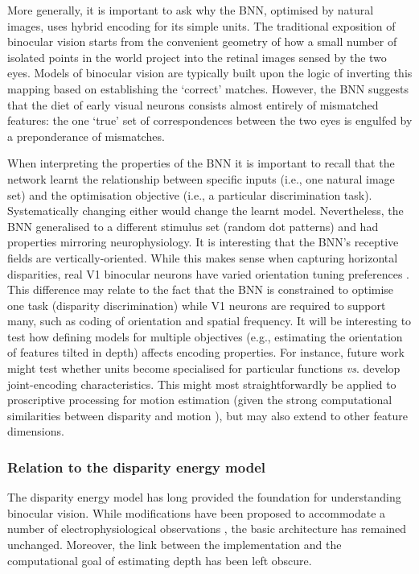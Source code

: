 More generally, it is important to ask why the BNN, optimised by natural images, uses hybrid encoding for its simple units. The traditional exposition of binocular vision starts from the convenient geometry of how a small number of isolated points in the world project into the retinal images sensed by the two eyes. Models of binocular vision are typically built upon the logic of inverting this mapping based on establishing the `correct' matches. However, the BNN suggests that the diet of early visual neurons consists almost entirely of mismatched features: the one `true' set of correspondences between the two eyes is engulfed by a preponderance of mismatches. 

When interpreting the properties of the BNN it is important to recall that the network learnt the relationship between specific inputs (i.e., one natural image set) and the optimisation objective (i.e., a particular discrimination task). Systematically changing either would change the learnt model. Nevertheless, the BNN generalised to a different stimulus set (random dot patterns) and had properties mirroring neurophysiology. It is interesting that the BNN's receptive fields are vertically-oriented. While this makes sense when capturing horizontal disparities, real V1 binocular neurons have varied orientation tuning preferences \cite{DeAngelis:1991mb}. This difference may relate to the fact that the BNN is constrained to optimise one task (disparity discrimination) while V1 neurons are required to support many, such as coding of orientation and spatial frequency. It will be interesting to test how defining models for multiple objectives (e.g., estimating the orientation of features tilted in depth) affects encoding properties. For instance, future work might test whether units become specialised for particular functions {\it vs}. develop joint-encoding characteristics. This might most straightforwardly be applied to proscriptive processing for motion estimation (given the strong computational similarities between disparity and motion \cite{Anzai:2001wi}), but may also extend to other feature dimensions.

\subsubsection*{Relation to the disparity energy model}

The disparity energy model \cite{Ohzawa:1990cq, Fleet:1996tq, Qian:1997bu} has long provided the foundation for understanding binocular vision. While modifications have been proposed to accommodate a number of electrophysiological observations \cite{Read:2002kx,Haefner:2008jg,Samonds:2013cs}, the basic architecture has remained unchanged. Moreover, the link between the implementation and the computational goal of estimating depth has been left obscure.

